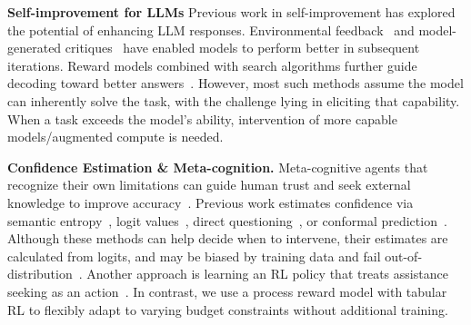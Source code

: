 \textbf{Self-improvement for LLMs }Previous work in self-improvement has explored the potential of enhancing LLM responses. 
Environmental feedback~\cite{gou2024critic,qiao-etal-2024-making,liu2024agentbench,chen2024teaching,anonymous2025livecodebench} and model-generated critiques~\cite{madaan2023selfrefine,wang2023shepherdcriticlanguagemodel,welleck2023generating,lin2024generating,qu2024recursive} have enabled models to perform better in subsequent iterations. Reward models combined with search algorithms further guide decoding toward better answers~\cite{nakano2021webgpt,uesato2022solvingmathwordproblems,zelikman2022star,xie2023selfevaluation,lightman2024lets}. However, most such methods assume the model can inherently solve the task, with the challenge lying in eliciting that capability. When a task exceeds the model’s ability, intervention of more capable models/augmented compute is needed.

\textbf{Confidence Estimation \& Meta-cognition.} Meta-cognitive agents that recognize their own limitations can guide human trust and seek external knowledge to improve accuracy~\cite{mallen-etal-2023-trust,asai2024selfrag}. Previous work estimates confidence via semantic entropy~\cite{kuhn2023semantic}, logit values~\cite{jiang-etal-2021-know,Kadavath2022LanguageM}, direct questioning~\cite{zhou-etal-2023-navigating,lin2024generating,xiong2024can}, or conformal prediction~\cite{ren2023robots}. Although these methods can help decide when to intervene, their estimates are calculated from logits, and may be biased by training data and fail out-of-distribution~\cite{Xiao2022UncertaintyQW,zhou-etal-2023-navigating}. Another approach is learning an RL policy that treats assistance seeking as an action~\cite{Chi2019JustAA,Nguyen2021LearningWA,liu2022asking,singh2022askhelp,xie2022when,hu2024uncertainty}. In contrast, we use a process reward model with tabular RL to flexibly adapt to varying budget constraints without additional training.